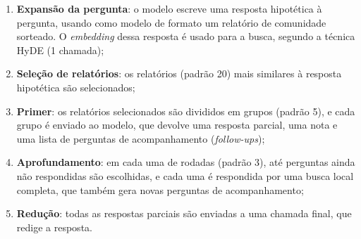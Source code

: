 \begin{enumerate}
    \item \textbf{Expansão da pergunta}: o modelo escreve uma resposta hipotética à pergunta, usando como modelo de formato um relatório de comunidade sorteado. O \textit{embedding} dessa resposta é usado para a busca, segundo a técnica HyDE \cite{gao2023hyde} (1 chamada);
    \item \textbf{Seleção de relatórios}: os  relatórios (padrão 20) mais similares à resposta hipotética são selecionados;
    \item \textbf{Primer}: os relatórios selecionados são divididos em  grupos (padrão 5), e cada grupo é enviado ao modelo, que devolve uma resposta parcial, uma nota e uma lista de perguntas de acompanhamento (\textit{follow-ups});
    \item \textbf{Aprofundamento}: em cada uma de  rodadas (padrão 3), até  perguntas ainda não respondidas são escolhidas, e cada uma é respondida por uma busca local completa, que também gera novas perguntas de acompanhamento;
    \item \textbf{Redução}: todas as respostas parciais são enviadas a uma chamada final, que redige a resposta.
\end{enumerate}

